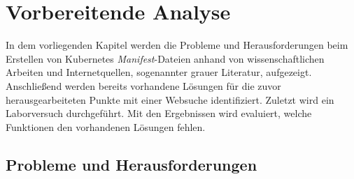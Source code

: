 \chapter{Vorbereitende Analyse}\label{ch:preparation-analysis}

In dem vorliegenden Kapitel werden die Probleme und Herausforderungen beim Erstellen von Kubernetes \textit{Manifest}-Dateien anhand von wissenschaftlichen Arbeiten
und Internetquellen, sogenannter grauer Literatur, aufgezeigt. Anschließend werden bereits vorhandene Lösungen für die zuvor herausgearbeiteten Punkte mit einer Websuche identifiziert.
Zuletzt wird ein Laborversuch durchgeführt. Mit den Ergebnissen wird evaluiert, welche Funktionen den vorhandenen Lösungen fehlen.

\section{Probleme und Herausforderungen}

